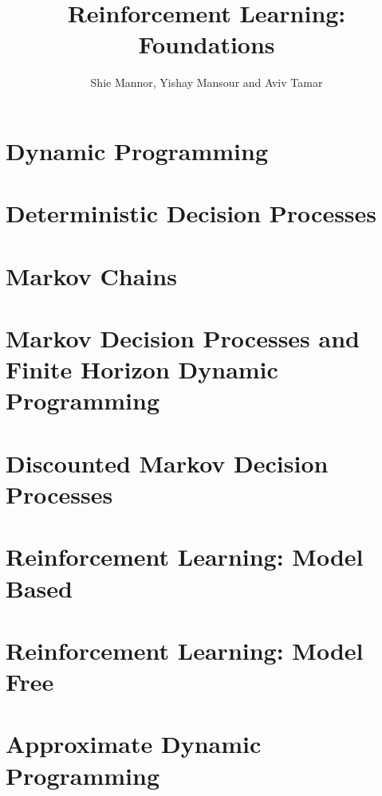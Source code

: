 \documentclass[12pt]{book}
\title{Reinforcement Learning: Foundations}
\date{February 2023
\\
  \textcolor{red}{This book is still work in progress. In particular, references to literature are not complete. We would be grateful for comments, suggestions, omissions, and errors of any kind, at \url{rlfoundationsbook@gmail.com}. }

}
\author{Shie Mannor, Yishay Mansour and Aviv Tamar}
\begin{document}
\maketitle

\tableofcontents

\chapter{Dynamic Programming}
\label{chapter:dp}


\chapter{Deterministic Decision Processes}
\label{chapter:DDP}


\chapter{Markov Chains}
\label{chapter:MC}


\chapter{Markov Decision Processes and Finite Horizon Dynamic Programming}
\label{chapter:MDP-FH}


\chapter{Discounted Markov Decision Processes}
\label{chapter:disc}


\chapter{Reinforcement Learning: Model Based}\label{chapter-model-based}


\chapter{Reinforcement Learning: Model Free}
\label{chapter:learning-model-free}

% 
% 

\chapter{Approximate Dynamic Programming}
\label{chapter:approx-dp}

\end{document}
